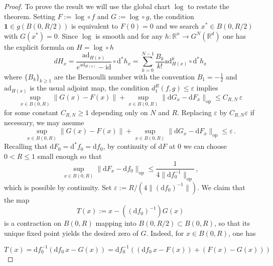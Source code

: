 \documentclass[10pt,a4paper]{amsart}
\begin{document}
\begin{proof}
To prove the result we will use the global chart $\log$ to restate the theorem. Setting $F := \log \circ f$ and $G := \log \circ g$, the condition
$\mathbf{1} \in g(B(0,R/2))$ is equivalent to $F(0)=0$ and we search $x^* \in B(0,R/2)$ with
$G(x^*)=0$. Since $\log$ is smooth and for any $h\colon \mathbb{R}^n \to G^N(\mathbb{R}^d)$ one has the explicit formula on $H= \log \circ h$
\[dH_x=\frac{\text{ad}_{H(x)}}{e^{\text{ad}_{H(x)}}- \text{id}}\circ \mathrm{d}^* h_x=\sum_{k=0}^{N-1}\frac{B_k}{k!}\text{ad}^k_{H(x)}\circ \mathrm{d}^* h_x\]
where $\{B_k\}_{k\geq 1}$ are the Bernoulli number with the convention $B_1=- \frac{1}{2}$ and $\text{ad}_{H(x)}$ is the usual adjoint map, the condition $d_1^R(f,g)\leq \varepsilon$ implies
\[
    \sup_{x\in B(0,R)}\|G(x) - F(x)\| +    \sup_{x\in B(0,R)}\|\mathrm{d}G_x - \mathrm{d}F_x\|_{\text{op}} \leq C_{R,N}\,\varepsilon
\]
for some constant $C_{R,N} \geq 1$ depending only on $N$ and $R$. Replacing $\varepsilon$ by $C_{R,N}\varepsilon$ if necessary, we may assume
\begin{equation}\label{eq:closeness}
    \sup_{x\in B(0,R)}\|G(x) - F(x)\| +    \sup_{x\in B(0,R)}\|\mathrm{d}G_x - \mathrm{d}F_x\|_{\text{op}}\leq \varepsilon\,.
\end{equation}
Recalling that $\mathrm{d}F_0= \mathrm{d}^*f_0=\mathrm{d}f_0 $, by continuity of $\mathrm{d}F$ at $0$ we can choose $0<R \leq 1$ small enough  so that
\begin{equation}\label{eq:R}
    \sup_{x \in B(0,R)} \|\mathrm{d}F_x - \mathrm{d}f_0\|_{\text{op}}
    \leq \frac{1}{4\|\mathrm{d}f_0^{-1}\|_{\text{op}}}\,,
\end{equation}
which is possible by continuity. Set $\varepsilon := R/(4\|(\mathrm{d}f_0)^{-1}\|)$. We claim that the map
\[
    T(x) := x - ((\mathrm{d}f_0)^{-1})G(x)
\]
is a contraction on $B(0,R)$ mapping into $B(0,R/2)\subset B(0,R)$, so that its unique fixed point yields the desired zero of $G$.  Indeed, for
$x\in B(0,R)$, one has 

\[T(x) = \mathrm{d}f_0^{-1}(\mathrm{d}f_0\,x - G(x))= \mathrm{d}f_0^{-1}\left((\mathrm{d}f_0\,x - F(x)) + (F(x)-G(x))\right)\]


\end{proof}
\end{document}
